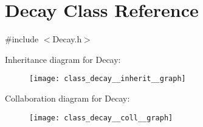 \hypertarget{class_decay}{}\section{Decay Class Reference}
\label{class_decay}


{\ttfamily \#include $<$Decay.\+h$>$}



Inheritance diagram for Decay\+:
\nopagebreak
\begin{figure}[H]
\begin{center}
\leavevmode
\texttt{[image: class\_decay\_\_inherit\_\_graph]}
\end{center}
\end{figure}


Collaboration diagram for Decay\+:
\nopagebreak
\begin{figure}[H]
\begin{center}
\leavevmode
\texttt{[image: class\_decay\_\_coll\_\_graph]}
\end{center}
\end{figure}

